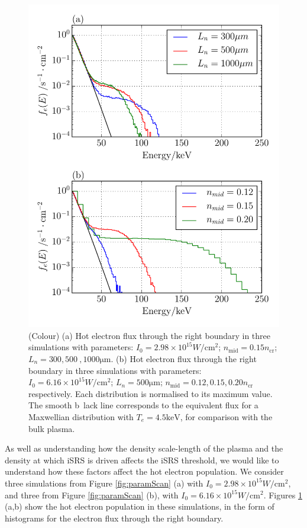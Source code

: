 \begin{figure}[ht]
   \centering
    \includegraphics[width=0.75\columnwidth]{Chapters/C4_iSRS/fig7_7a_7b.pdf}
    \caption{(Colour) (a) Hot electron flux through the right boundary in three simulations with parameters: $I_0 = 2.98\times 10^{15} \si{W / \centi \metre^2}$; $n_\mathrm{mid}=0.15 n_\mathrm{cr}$; $L_n=300,500\
,1000\si{\micro\metre}$.   (b) Hot electron flux through the right boundary in three simulations with parameters:
   $I_0 = 6.16\times 10^{15} \si{W / \centi \metre^2}$;  $L_n=500\si{\micro\metre}$; $n_\mathrm{mid}=0.12,0.15,0.20 n_\mathrm{cr}$ respectively. Each distribution is normalised to its maximum value. The smooth b\
lack line corresponds to the equivalent flux for a Maxwellian
   distribution with $T_e=4.5\si{\kilo \electronvolt}$, for comparison with the
   bulk plasma.}
    \label{fig:hotelectrons}
\end{figure}{}

As well as understanding how the density scale-length of the plasma and the
density at which iSRS is driven affects the iSRS threshold, we would like to
understand how these factors affect the hot electron
population. We consider three simulations from Figure \ref{fig:paramScan} (a)
with $I_0 = 2.98\times 10^{15} \si{W / \centi \metre^2}$, and three from Figure
\ref{fig:paramScan} (b), with $I_0 = 6.16\times 10^{15} \si{W / \centi
\metre^2}$. Figures \ref{fig:hotelectrons} (a,b) show the hot electron
population in these simulations, in the form of histograms for the electron
flux through the right boundary.


